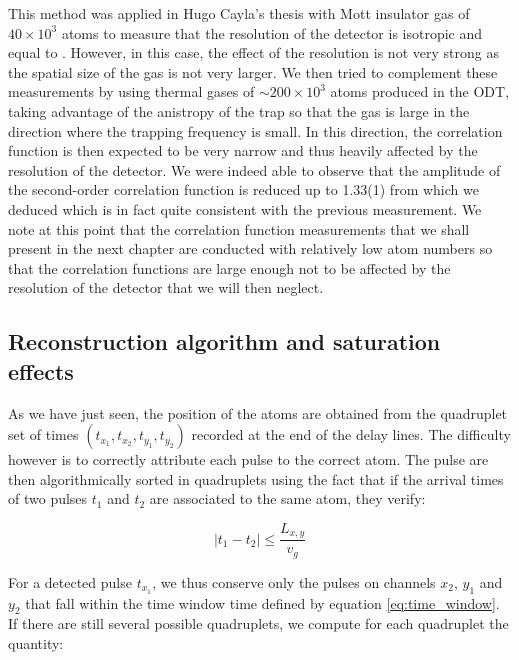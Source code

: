  This method was applied in Hugo Cayla's thesis \cite{cayla_these} with Mott insulator gas of $40 \times 10^3$ atoms to measure that the resolution of the detector is isotropic and equal to . However, in this case, the effect of the resolution is not very strong as the spatial size of the gas is not very larger. We then tried to complement these measurements by using thermal gases of $\sim 200 \times 10^3$ atoms produced in the ODT, taking advantage of the anistropy of the trap so that the gas is large in the direction where the trapping frequency is small. In this direction, the correlation function is then expected to be very narrow and thus heavily affected by the resolution of the detector. We were indeed able to observe that the amplitude of the second-order correlation function is reduced up to 1.33(1) from which we deduced  which is in fact quite consistent with the previous measurement. We note at this point that the correlation function measurements that we shall present in the next chapter are conducted with relatively low atom numbers so that the correlation functions are large enough not to be affected by the resolution of the detector that we will then neglect.


\subsection{Reconstruction algorithm and saturation effects}

As we have just seen, the position of the atoms are obtained from the quadruplet set of times $(t_{x_1},t_{x_2},t_{y_1},t_{y_2})$ recorded at the end of the delay lines. The difficulty however is to correctly attribute each pulse to the correct atom. The pulse are then algorithmically sorted in quadruplets using the fact that if the arrival times of two pulses $t_1$ and $t_2$ are associated to the same atom, they verify:

\begin{equation}
    |t_1-t_2| \leq \frac{L_{x,y}}{v_g}
    \label{eq:time_window}
\end{equation}

\noindent For a detected pulse $t_{x_1}$, we thus conserve only the pulses on channels $x_2$, $y_1$ and $y_2$ that fall within the time window time defined by equation \ref{eq:time_window}. If there are still several possible quadruplets, we compute for each quadruplet the quantity:

